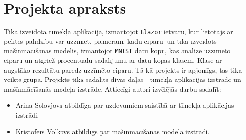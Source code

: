 \section{Projekta apraksts}

    Tika izveidota tīmekļa aplikācija, izmantojot \texttt{Blazor} ietvaru, kur lietotājs
    ar pelītes palīdzību var uzzīmēt, piemēram, kādu ciparu, un tika izveidots mašīnmācīšanās modelis,
    izmantojot \texttt{MNIST} datu kopu, kas analizē uzzīmēto ciparu un atgriež procentuālu sadalījumu ar datu kopas klasēm. Klase ar augstāko rezultātu paredz uzzīmēto ciparu. Tā kā projekts ir apjomīgs, tas tika veikts grupā. Projekts tika
    sadalīts divās daļās - tīmekļa aplikācijas izstrāde un mašīnmācīšanās modeļa izstrāde. Attiecīgi autori
    izvēlējās darbu sadalīt:

    \begin{itemize}
        \item Arina Solovjova atbildīga par uzdevumiem saistībā ar tīmekļa
    aplikācijas izstrādi
        \item Kristofers Volkovs atbildīgs par mašīnmācīšanās modeļa izstrādi.
    \end{itemize}

    

    
